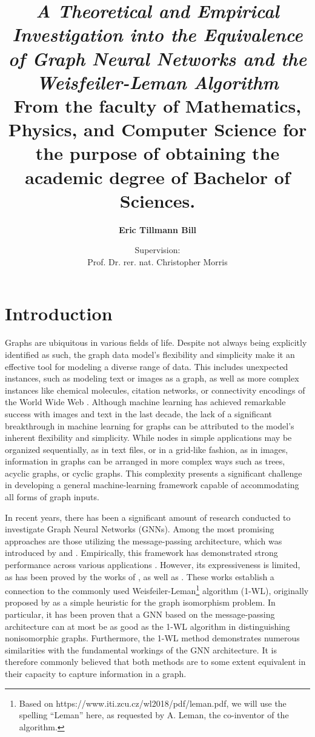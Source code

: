 \documentclass[11pt, dvipsnames, DIV=12]{scrreprt}
\title{\emph{A Theoretical and Empirical Investigation into the Equivalence of Graph Neural Networks and the Weisfeiler-Leman Algorithm}\\
\vspace{20pt}\small{\normalfont From the faculty of Mathematics, Physics, and Computer Science for the purpose of obtaining the academic degree of Bachelor of Sciences.}
}
\author{\textbf{Eric Tillmann Bill}}
\affil{\vspace{100pt}}
\author{Supervision:\\Prof. Dr. rer. nat. Christopher Morris}
\affil{Informatik 6\\RWTH Aachen University}
\date{\vspace{-30pt}}
\theoremstyle{definition}
\begin{document}
\maketitle
\tableofcontents
\newpage



\section{Introduction}
Graphs are ubiquitous in various fields of life. Despite not always being explicitly identified as such, the graph data model's flexibility and simplicity make it an effective tool for modeling a diverse range of data. This includes unexpected instances, such as modeling text or images as a graph, as well as more complex instances like chemical molecules, citation networks, or connectivity encodings of the World Wide Web \cite{Mor+2020, Sca+2009}.
Although machine learning has achieved remarkable success with images and text in the last decade, the lack of a significant breakthrough in machine learning for graphs can be attributed to the model's inherent flexibility and simplicity. While nodes in simple applications may be organized sequentially, as in text files, or in a grid-like fashion, as in images, information in graphs can be arranged in more complex ways such as trees, acyclic graphs, or cyclic graphs. This complexity presents a significant challenge in developing a general machine-learning framework capable of accommodating all forms of graph inputs.


In recent years, there has been a significant amount of research conducted to investigate Graph Neural Networks (GNNs). Among the most promising approaches are those utilizing the message-passing architecture, which was introduced by \cite{Gil+2017} and \cite{Sca+2009}. Empirically, this framework has demonstrated strong performance across various applications \cite{Kip+2017, Ham+2017, Xu2018}. However, its expressiveness is limited, as has been proved by the works of \cite{Morris2018}, as well as \cite{Xu2018}. These works establish a connection to the commonly used Weisfeiler-Leman\footnote{Based on https://www.iti.zcu.cz/wl2018/pdf/leman.pdf, we will use the spelling ``Leman'' here, as requested by A. Leman, the co-inventor of the algorithm.} algorithm (1-WL), originally proposed by \cite{Wei+1968} as a simple heuristic for the graph isomorphism problem. In particular, it has been proven that a GNN based on the message-passing architecture can at most be as good as the 1-WL algorithm in distinguishing nonisomorphic graphs. Furthermore, the 1-WL method demonstrates numerous similarities with the fundamental workings of the GNN architecture. It is therefore commonly believed that both methods are to some extent equivalent in their capacity to capture information in a graph.
\end{document}
